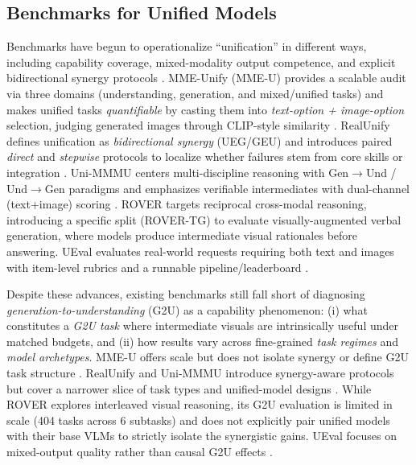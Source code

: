 \documentclass{article}
\theoremstyle{plain}
\theoremstyle{definition}
\theoremstyle{remark}
\begin{document}
\subsection{Benchmarks for Unified Models}
Benchmarks have begun to operationalize ``unification'' in different ways, including capability coverage, mixed-modality output competence, and explicit bidirectional synergy protocols \citep{xie2025mmeunify,shi2025realunify,zou2025unimmmu,li2026ueval,tirbench_2025}.
MME-Unify (MME-U) provides a scalable audit via three domains (understanding, generation, and mixed/unified tasks) and makes unified tasks \emph{quantifiable} by casting them into \emph{text-option + image-option} selection, judging generated images through CLIP-style similarity \citep{xie2025mmeunify,radford2021clip}.
RealUnify defines unification as \emph{bidirectional synergy} (UEG/GEU) and introduces paired \emph{direct} and \emph{stepwise} protocols to localize whether failures stem from core skills or integration \citep{shi2025realunify}.
Uni-MMMU centers multi-discipline reasoning with Gen$\rightarrow$Und / Und$\rightarrow$Gen paradigms and emphasizes verifiable intermediates with dual-channel (text+image) scoring \citep{zou2025unimmmu,yue2023mmmu}.
ROVER targets reciprocal cross-modal reasoning, introducing a specific split (ROVER-TG) to evaluate visually-augmented verbal generation, where models produce intermediate visual rationales before answering\citep{liang2025rover}.
UEval evaluates real-world requests requiring both text and images with item-level rubrics and a runnable pipeline/leaderboard \citep{li2026ueval,li2025unieval}.

Despite these advances, existing benchmarks still fall short of diagnosing \emph{generation-to-understanding} (G2U) as a capability phenomenon: (i) what constitutes a \emph{G2U task} where intermediate visuals are intrinsically useful under matched budgets, and (ii) how results vary across fine-grained \emph{task regimes} and \emph{model archetypes}.
MME-U offers scale but does not isolate synergy or define G2U task structure \citep{xie2025mmeunify}. RealUnify and Uni-MMMU introduce synergy-aware protocols but cover a narrower slice of task types and unified-model designs \citep{shi2025realunify,zou2025unimmmu}. While ROVER explores interleaved visual reasoning, its G2U evaluation is limited in scale (404 tasks across 6 subtasks) and does not explicitly pair unified models with their base VLMs to strictly isolate the synergistic gains. UEval focuses on mixed-output quality rather than causal G2U effects \citep{li2026ueval}.
\end{document}
